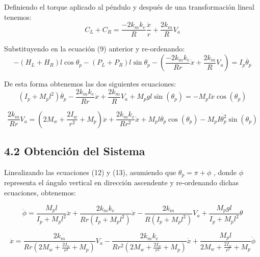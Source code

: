 \documentclass[10pt]{article}
\begin{document}
Definiendo el torque aplicado al péndulo y después de una transformación lineal tenemos:
\begin{equation} 
C_{L} + C_{R} = \frac{-2k_{m}k_{e}}{R}\frac{\dot{x}}{r} + \frac{2k_{m}}{R}V_{a}
\end{equation}
 
\vspace{2 mm}
Substituyendo en la ecuación (9) anterior y re-ordenando:
\begin{equation}
-(H_{L} + H_{R})l\cos{\theta_{p}} - (P_{L} + P_{R})l\sin{\theta_{p}} - (\frac{-2k_{m}k_{e}}{Rr}\dot{x} + \frac{2k_{m}}{R}V_{a}) = I_{p}\ddot{\theta_{p}}
\end{equation}

\vspace{2 mm}
De esta forma obtenemos las dos siguientes ecuaciones:
\vspace{2 mm}
\begin{equation}
(I_{p} + M_{p}l^2)\ddot{\theta_{p}} - \frac{2k_{m}k_{e}}{Rr}\dot{x} + \frac{2k_{m}}{R}V_{a} + M_{p}gl\sin(\theta_{p}) = -M_{p}l\ddot{x}\cos(\theta_{p})
\end{equation}

\begin{equation}
\frac{2k_{m}}{Rr}V_{a} = (2M_{w} + \frac{2I_{w}}{r^2} + M_{p})\ddot{x} + \frac{2k_{m}k_{e}}{Rr^2}\dot{x} + M_{p}l\ddot{\theta_{p}}\cos(\theta_{p}) - M_{p}I\dot{\theta_{p}^2}\sin(\theta_{p})
\end{equation}

\vspace{2 mm}
\subsection*{4.2 Obtención del Sistema}
\vspace{2 mm}
Linealizando las ecuaciones (12) y (13), asumiendo que $\theta_{p} = \pi + \phi$ , donde $\phi$ representa el ángulo vertical en dirección ascendente y re-ordenando dichas ecuaciones, obtenemos:

\vspace{2 mm}
\begin{equation}
\ddot{\phi} = \frac{M_{p}l}{I_{p} + M_{p}l^2}\ddot{x} + \frac{2k_{m}k_{e}}{Rr(I_{p} + M_{p}l^2)}\dot{x} - \frac{2k_{m}}{R(I_{p} + M_{p}l^2)}V_{a} + \frac{M_{p}gl}{I_{p} + M_{p}l^2}\theta
\end{equation}

\vspace{2 mm}
\begin{equation}
\ddot{x} = \frac{2k_{m}}{Rr(2M_{w} + \frac{2I_{w}}{r^2} + M_{p})}V_{a} - \frac{2k_{m}k_{e}}{Rr^2(2M_{w} + \frac{2I_{w}}{r^2} + M_{p})}\dot{x} + \frac{M_{p}l}{2M_{w} + \frac{2I_{w}}{r^2} + M_{p}}\ddot{\phi}
\end{equation}
\end{document}
